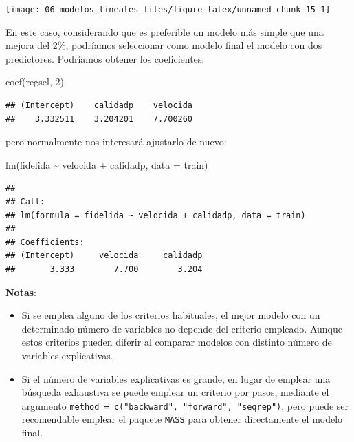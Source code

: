 \documentclass[
]{book}
\newenvironment{Shaded}{\begin{snugshade}}{\end{snugshade}}
\newcommand{\AttributeTok}[1]{\textcolor[rgb]{0.77,0.63,0.00}{#1}}
\newcommand{\DecValTok}[1]{\textcolor[rgb]{0.00,0.00,0.81}{#1}}
\newcommand{\FunctionTok}[1]{\textcolor[rgb]{0.00,0.00,0.00}{#1}}
\newcommand{\NormalTok}[1]{#1}
\newcommand{\SpecialCharTok}[1]{\textcolor[rgb]{0.00,0.00,0.00}{#1}}
\theoremstyle{break}
\theoremstyle{definition}
\theoremstyle{definition}
\theoremstyle{definition}
\theoremstyle{definition}
\theoremstyle{remark}
\begin{document}
\begin{center}\texttt{[image: 06-modelos\_lineales\_files/figure-latex/unnamed-chunk-15-1]} \end{center}

En este caso, considerando que es preferible un modelo más simple que una mejora del 2\%, podríamos seleccionar como modelo final el modelo con dos predictores.
Podríamos obtener los coeficientes:

\begin{Shaded}
\begin{Highlighting}[]
\FunctionTok{coef}\NormalTok{(regsel, }\DecValTok{2}\NormalTok{)}
\end{Highlighting}
\end{Shaded}

\begin{verbatim}
## (Intercept)    calidadp    velocida 
##    3.332511    3.204201    7.700260
\end{verbatim}

pero normalmente nos interesará ajustarlo de nuevo:

\begin{Shaded}
\begin{Highlighting}[]
\FunctionTok{lm}\NormalTok{(fidelida }\SpecialCharTok{\textasciitilde{}}\NormalTok{ velocida }\SpecialCharTok{+}\NormalTok{ calidadp, }\AttributeTok{data =}\NormalTok{ train)}
\end{Highlighting}
\end{Shaded}

\begin{verbatim}
## 
## Call:
## lm(formula = fidelida ~ velocida + calidadp, data = train)
## 
## Coefficients:
## (Intercept)     velocida     calidadp  
##       3.333        7.700        3.204
\end{verbatim}

\textbf{Notas}:

\begin{itemize}
\item
  Si se emplea alguno de los criterios habituales, el mejor modelo con un determinado
  número de variables no depende del criterio empleado.
  Aunque estos criterios pueden diferir al comparar modelos con distinto número de
  variables explicativas.
\item
  Si el número de variables explicativas es grande, en lugar de emplear una
  búsqueda exhaustiva se puede emplear un criterio por pasos, mediante el argumento
  \texttt{method\ =\ c("backward",\ "forward",\ "seqrep")}, pero puede ser recomendable
  emplear el paquete \texttt{MASS} para obtener directamente el modelo final.
\end{itemize}
\end{document}
